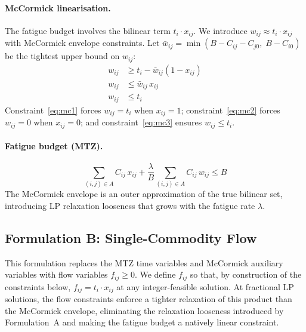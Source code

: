 \documentclass[preprint,11pt]{elsarticle}
\begin{document}
\paragraph{McCormick linearisation.}
The fatigue budget involves the bilinear term $t_i \cdot x_{ij}$.
We introduce $w_{ij} \approx t_i \cdot x_{ij}$ with McCormick envelope constraints.
Let $\bar{w}_{ij} = \min(B - C_{ij} - C_{j0},\; B - C_{i0})$ be the tightest upper bound on $w_{ij}$:
\begin{align}
  w_{ij} &\geq t_i - \bar{w}_{ij}(1 - x_{ij}) \label{eq:mc1} \\
  w_{ij} &\leq \bar{w}_{ij} \, x_{ij} \label{eq:mc2} \\
  w_{ij} &\leq t_i \label{eq:mc3}
\end{align}
Constraint~\eqref{eq:mc1} forces $w_{ij} = t_i$ when $x_{ij} = 1$; constraint~\eqref{eq:mc2} forces $w_{ij} = 0$ when $x_{ij} = 0$; and constraint~\eqref{eq:mc3} ensures $w_{ij} \leq t_i$.

\paragraph{Fatigue budget (MTZ).}
\begin{equation}
  \sum_{(i,j) \in A} C_{ij} \, x_{ij} + \frac{\lambda}{B} \sum_{(i,j) \in A} C_{ij} \, w_{ij} \leq B
  \label{eq:fatigue_budget}
\end{equation}
The McCormick envelope is an outer approximation of the true bilinear set, introducing LP relaxation looseness that grows with the fatigue rate $\lambda$.

\subsection{Formulation B: Single-Commodity Flow}
\label{sec:formulation_flow}

This formulation replaces the MTZ time variables and McCormick auxiliary variables with flow variables $f_{ij} \geq 0$.
We define $f_{ij}$ so that, by construction of the constraints below, $f_{ij} = t_i \cdot x_{ij}$ at any integer-feasible solution.
At fractional LP solutions, the flow constraints enforce a tighter relaxation of this product than the McCormick envelope, eliminating the relaxation looseness introduced by Formulation~A and making the fatigue budget a natively linear constraint.
\end{document}
